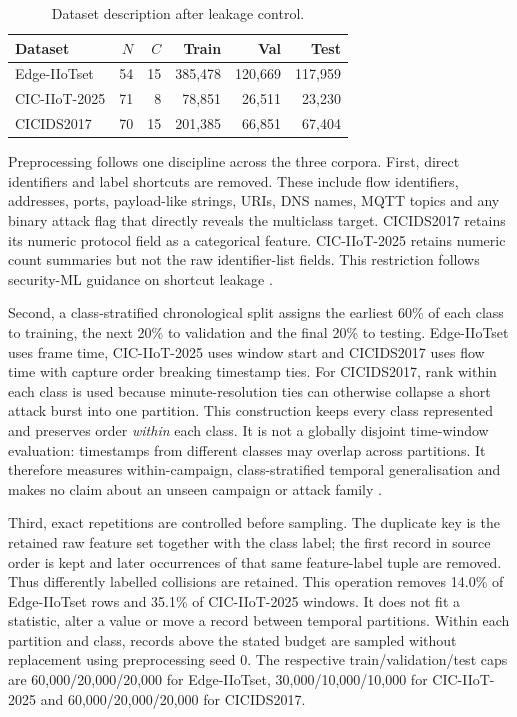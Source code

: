 \documentclass[10pt,letterpaper,twocolumn]{article}
\begin{document}
\begin{table}[!ht]
\centering
\caption{Dataset description after leakage control.}
\label{tab:datasets}
\begin{tabular}{lrrrrr}
\toprule
Dataset & $N$ & $C$ & Train & Val & Test \\
\midrule
Edge-IIoTset  & 54 & 15 & 385,478 & 120,669 & 117,959 \\
CIC-IIoT-2025 & 71 &  8 &  78,851 &  26,511 &  23,230 \\
CICIDS2017    & 70 & 15 & 201,385 &  66,851 &  67,404 \\
\bottomrule
\end{tabular}
\end{table}

Preprocessing follows one discipline across the three corpora. First, direct
identifiers and label shortcuts are removed. These include flow identifiers,
addresses, ports, payload-like strings, URIs, DNS names, MQTT topics and any
binary attack flag that directly reveals the multiclass target. CICIDS2017
retains its numeric protocol field as a categorical feature. CIC-IIoT-2025
retains numeric count summaries but not the raw identifier-list fields. This
restriction follows security-ML guidance on shortcut leakage
\cite{arp2022dos,sarhan2022standard}.

Second, a class-stratified chronological split assigns the earliest 60\% of
each class to training, the next 20\% to validation and the final 20\% to
testing. Edge-IIoTset uses frame time, CIC-IIoT-2025 uses window start and
CICIDS2017 uses flow time with capture order breaking timestamp ties. For
CICIDS2017, rank within each class is used because minute-resolution ties can
otherwise collapse a short attack burst into one partition. This construction
keeps every class represented and preserves order \emph{within} each class. It
is not a globally disjoint time-window evaluation: timestamps from different
classes may overlap across partitions. It therefore measures within-campaign,
class-stratified temporal generalisation and makes no claim about an unseen
campaign or attack family \cite{pendlebury2019tesseract}.

Third, exact repetitions are controlled before sampling. The duplicate key is
the retained raw feature set together with the class label; the first record in
source order is kept and later occurrences of that same feature-label tuple
are removed. Thus differently labelled collisions are retained. This operation
removes 14.0\% of Edge-IIoTset rows and 35.1\% of CIC-IIoT-2025 windows. It
does not fit a statistic, alter a value or move a record between temporal
partitions. Within each partition and class, records above the stated budget
are sampled without replacement using preprocessing seed 0. The respective
train/validation/test caps are 60,000/20,000/20,000 for Edge-IIoTset,
30,000/10,000/10,000 for CIC-IIoT-2025 and 60,000/20,000/20,000 for
CICIDS2017.
\end{document}
